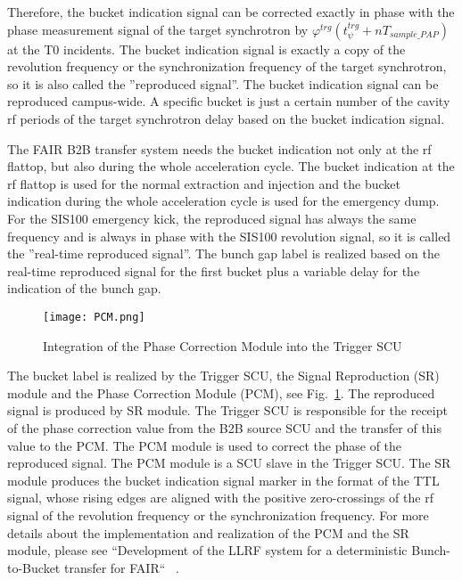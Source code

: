Therefore, the bucket indication signal can be corrected exactly in phase with the phase measurement signal of the target synchrotron by $ \varphi^\mathit{trg}(t_\mathit{\psi}^\mathit{trg}+nT_\mathit{sample\_PAP})$ at the T0 incidents. The bucket indication signal is exactly a copy of the revolution frequency or the synchronization frequency of the target synchrotron, so
it is also called the ”reproduced signal”. The bucket indication signal can be reproduced campus-wide. A specific bucket is just a certain number of the cavity rf periods of the target synchrotron delay based on the bucket indication signal.






The FAIR B2B transfer system needs the bucket indication not only at the rf flattop, but also during the whole acceleration cycle. The bucket indication at the rf flattop is used for the normal extraction and injection and the bucket indication during the whole acceleration cycle is used for the emergency dump. For the SIS100 emergency kick, the reproduced signal has always the same frequency and is always in phase with the SIS100 revolution signal, so it is called the ''real-time reproduced signal''. The bunch gap label is realized based on the real-time reproduced signal for the first bucket plus a variable delay for the indication of the bunch gap.


 \begin{figure}[!htb]
   \centering   
   \texttt{[image: PCM.png]}
   \caption{Integration of the Phase Correction Module into the Trigger SCU}
   \label{PCM}
\end{figure}
The bucket label is realized by the Trigger SCU, the Signal Reproduction (SR) module and the Phase Correction Module (PCM), see Fig.~\ref{PCM}. The reproduced signal is produced by SR module. The Trigger SCU is responsible for the receipt of the phase correction value from the B2B source SCU and the transfer of this value to the PCM. The PCM module is used to correct the phase of the reproduced signal. The PCM module is a SCU slave in the Trigger SCU. The SR module produces the bucket indication signal marker in the format of the TTL signal, whose rising edges are aligned with the positive zero-crossings of the rf signal of the revolution frequency or the synchronization frequency. For more details about the implementation and realization of the PCM and the SR module, please see ``Development of the LLRF system for a deterministic Bunch-to-Bucket transfer for FAIR`` ~\cite{ferrand_development_????}. 

